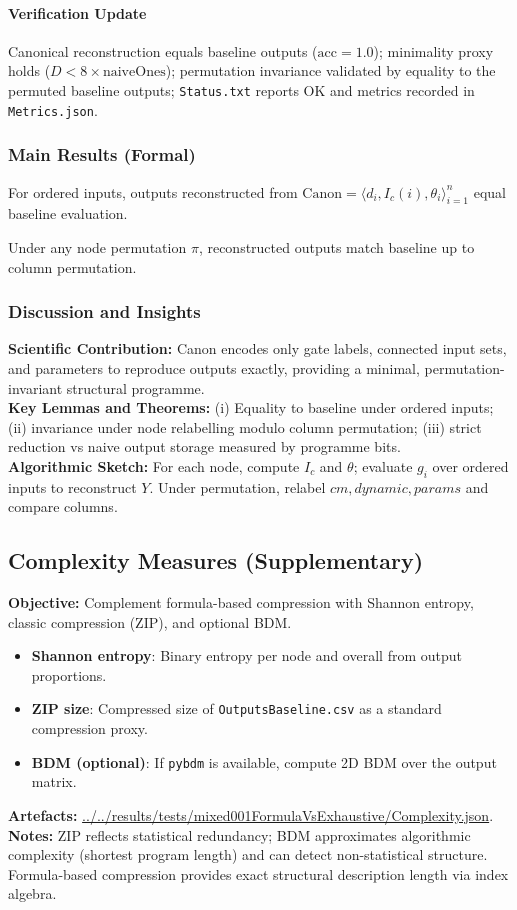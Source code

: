 \documentclass{article}
\begin{document}
\paragraph{Verification Update} Canonical reconstruction equals baseline outputs (\(\mathrm{acc}=1.0\)); minimality proxy holds (\(D<8\times\mathrm{naiveOnes}\)); permutation invariance validated by equality to the permuted baseline outputs; \texttt{Status.txt} reports OK and metrics recorded in \texttt{Metrics.json}.
\subsubsection*{Main Results (Formal)}
\begin{theorem}
For ordered inputs, outputs reconstructed from \(\mathrm{Canon}=\langle d_i, I_c(i), \theta_i\rangle_{i=1}^n\) equal baseline evaluation.
\end{theorem}
\begin{lemma}
Under any node permutation \(\pi\), reconstructed outputs match baseline up to column permutation.
\end{lemma}
\subsubsection*{Discussion and Insights}
\textbf{Scientific Contribution:} Canon encodes only gate labels, connected input sets, and parameters to reproduce outputs exactly, providing a minimal, permutation-invariant structural programme.\\
\textbf{Key Lemmas and Theorems:} (i) Equality to baseline under ordered inputs; (ii) invariance under node relabelling modulo column permutation; (iii) strict reduction vs naive output storage measured by programme bits.\\
\textbf{Algorithmic Sketch:} For each node, compute \(I_c\) and \(\theta\); evaluate \(g_i\) over ordered inputs to reconstruct \(Y\). Under permutation, relabel \(cm, dynamic, params\) and compare columns.

\subsection{Complexity Measures (Supplementary)}
\textbf{Objective:} Complement formula-based compression with Shannon entropy, classic compression (ZIP), and optional BDM.
\begin{itemize}
 \item \textbf{Shannon entropy}: Binary entropy per node and overall from output proportions.
 \item \textbf{ZIP size}: Compressed size of \texttt{OutputsBaseline.csv} as a standard compression proxy.
 \item \textbf{BDM (optional)}: If \texttt{pybdm} is available, compute 2D BDM over the output matrix.
\end{itemize}
\textbf{Artefacts:} \url{../../results/tests/mixed001FormulaVsExhaustive/Complexity.json}.\\
\textbf{Notes:} ZIP reflects statistical redundancy; BDM approximates algorithmic complexity (shortest program length) and can detect non-statistical structure. Formula-based compression provides exact structural description length via index algebra.
\end{document}

